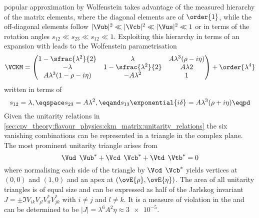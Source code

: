 popular approximation by Wolfenstein takes advantage of the measured hierarchy
of the matrix elements, where the diagonal elements are of $\order{1}$, while
the off-diagonal elements follow $\vert\Vub\vert^2 \ll \vert\Vcb\vert^2 \ll
\vert\Vus\vert^2 \ll 1$ or in terms of the rotation angles $s_{12} \ll s_{23}
\ll s_{12} \ll 1$. Exploiting this hierarchy in terms of an expansion with leads
to the Wolfenstein parametrisation
%
\begin{equation}  
  \VCKM = \begin{pmatrix}
    1 - \sfrac{\lambda^2}{2}        & \lambda                     & A \lambda^3 (\rho - i\eta)  \\
    -\lambda                        & 1 - \sfrac{\lambda^2}{2}    & A \lambda  2                \\
    A \lambda^3 (1 - \rho - i\eta)  & - A \lambda^2               & 1                           \\
  \end{pmatrix}
  + \order{\lambda^4}
\end{equation}
%
written in terms of
%
\begin{equation}
  s_{12} = \lambda, \eqspace s_{23} = A \lambda^2, \eqand s_{13}\exponential{i\delta} = A \lambda^3 (\rho + i \eta) \eqpd
\end{equation}
%
Given the unitarity relations in
\cref{sec:cpv_theory:flavour_physics:ckm_matrix:unitarity_relations} the six
vanishing combinations can be represented in a triangle in the complex plane.
The most prominent unitarity triangle arises from
%
\begin{equation}
  \Vud^{\phantom{\ast}}\Vub^{\ast} + \Vcd^{\phantom{\ast}}\Vcb^{\ast} + \Vtd^{\phantom{\ast}}\Vtb^{\ast} = 0 
\end{equation}
%
where normalising each side of the triangle by
$\Vcd^{\phantom{\ast}}\Vcb^{\ast}$ yields vertices at ${(0,0)}$ and ${(1,0)}$
and an apex at ${(\ovE{\rho},\ovE{\eta})}$. The area of all unitarity triangles
is of equal size and can be expressed as half of the Jarlskog invariant $J = \pm
\Im V_{ik}^{\phantom{\ast}} V_{jl}^{\phantom{\ast}} V_{il}^{\ast} V_{jk}^{\ast}$
with $i \neq j$ and $l \neq k$. It is a measure of \CP violation in the \SM and
can be determined to be $\vert J \vert = \lambda^6 A^2 \eta \approx \num{3e-5}$.

